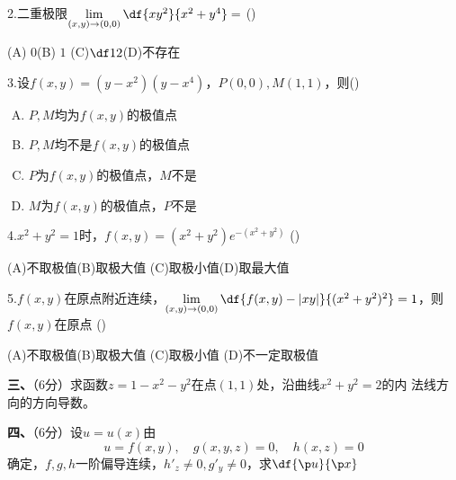 \bigskip
 
2.\;二重极限$\lim\limits_{(x,y)\to(0,0)}\df{xy^2}{x^2+y^4}=$
  (\underline{\hspace{1cm}})
  
  \hspace{2ex}(A) $0$\hspace{1cm}(B) $1$ 
  \hspace{1cm}(C)$\df12$\hspace{1cm}(D)不存在
  
\bigskip

3.\;设$f(x,y)=(y-x^2)(y-x^4)$，$P(0,0),M(1,1)$，则(\underline{\hspace{1cm}})
  \begin{enumerate}[(A)]
  \setlength{\itemindent}{3em}
    \item $P,M$均为$f(x,y)$的极值点
    \item $P,M$均不是$f(x,y)$的极值点
    \item $P$为$f(x,y)$的极值点，$M$不是
    \item $M$为$f(x,y)$的极值点，$P$不是
  \end{enumerate}

\bigskip

4.\;$x^2+y^2=1$时，$f(x,y)=(x^2+y^2)e^{-(x^2+y^2)}$ 
  (\underline{\hspace{1cm}})
  
  \hspace{2ex}(A)不取极值\hspace{1cm}(B)取极大值 \hspace{1cm}
  (C)取极小值\hspace{1cm}(D)取最大值

\bigskip

5.\;$f(x,y)$在原点附近连续，$\lim\limits_{(x,y)\to(0,0)}
  \df{f(x,y)-|xy|}{(x^2+y^2)^2}=1$，则$f(x,y)$在原点
  (\underline{\hspace{1cm}})
  
  \hspace{2ex}(A)不取极值\hspace{1cm}(B)取极大值 \hspace{1cm}(C)取极小值\hspace{1cm}
  (D)不一定取极值

\bigskip

{\bf 三、}（6分）求函数$z=1-x^2-y^2$在点$(1,1)$处，沿曲线$x^2+y^2=2$的内
法线方向的方向导数。

\bigskip

{\bf 四、}（6分）设$u=u(x)$由
$$u=f(x,y),\quad g(x,y,z)=0,\quad h(x,z)=0$$
确定，$f,g,h$一阶偏导连续，$h'_z\ne0,g'_y\ne0$，求$\df{\p u}{\p x}$

